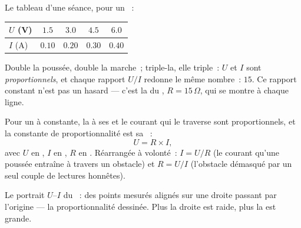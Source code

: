 \begin{example}\label{ex:g8:ohms-law:confession}
Le tableau d'une séance, pour un ~:
\begin{center}
\begin{tabular}{l|cccc}
$U$ (\unit{V}) & $1.5$ & $3.0$ & $4.5$ & $6.0$ \\
\hline
$I$ (\unit{A}) & $0.10$ & $0.20$ & $0.30$ & $0.40$
\end{tabular}
\end{center}
Double la poussée, double la marche~; triple-la, elle triple~: $U$ et
$I$ sont \emph{proportionnels}, et chaque rapport $U/I$ redonne le
même nombre~: $15$. Ce rapport constant n'est pas un hasard --- c'est
la  du , $R = 15\,\Omega$, qui se montre à chaque
ligne.
\end{example}

\begin{proposition}\label{prop:g8:ohms-law:law}
Pour un  à  constante, la  à ses  et
le courant qui le traverse sont proportionnels, et la constante de
proportionnalité est sa ~:
\[
U = R \times I ,
\]
avec $U$ en , $I$ en , $R$ en . Réarrangée à
volonté~: $I = U/R$ (le courant qu'une poussée entraîne à travers un
obstacle) et $R = U/I$ (l'obstacle démasqué par un seul couple de
lectures honnêtes).
\end{proposition}

\begin{omfigure}

{\small Le portrait $U$--$I$ du ~: des points mesurés alignés
sur une droite passant par l'origine --- la proportionnalité
dessinée. Plus la droite est raide, plus la  est grande.}
\end{omfigure}

